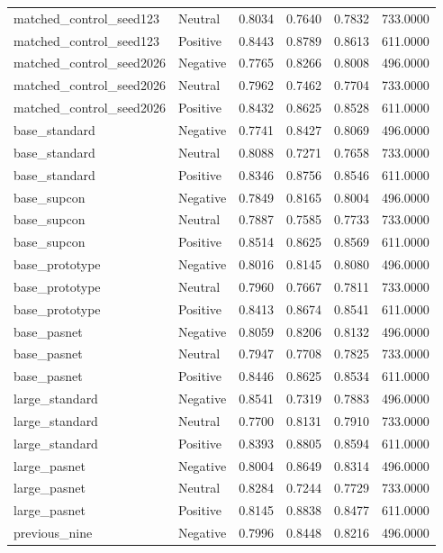 \begin{tabular}{llrrrr}
matched\_control\_seed123 & Neutral & 0.8034 & 0.7640 & 0.7832 & 733.0000 \\
matched\_control\_seed123 & Positive & 0.8443 & 0.8789 & 0.8613 & 611.0000 \\
matched\_control\_seed2026 & Negative & 0.7765 & 0.8266 & 0.8008 & 496.0000 \\
matched\_control\_seed2026 & Neutral & 0.7962 & 0.7462 & 0.7704 & 733.0000 \\
matched\_control\_seed2026 & Positive & 0.8432 & 0.8625 & 0.8528 & 611.0000 \\
base\_standard & Negative & 0.7741 & 0.8427 & 0.8069 & 496.0000 \\
base\_standard & Neutral & 0.8088 & 0.7271 & 0.7658 & 733.0000 \\
base\_standard & Positive & 0.8346 & 0.8756 & 0.8546 & 611.0000 \\
base\_supcon & Negative & 0.7849 & 0.8165 & 0.8004 & 496.0000 \\
base\_supcon & Neutral & 0.7887 & 0.7585 & 0.7733 & 733.0000 \\
base\_supcon & Positive & 0.8514 & 0.8625 & 0.8569 & 611.0000 \\
base\_prototype & Negative & 0.8016 & 0.8145 & 0.8080 & 496.0000 \\
base\_prototype & Neutral & 0.7960 & 0.7667 & 0.7811 & 733.0000 \\
base\_prototype & Positive & 0.8413 & 0.8674 & 0.8541 & 611.0000 \\
base\_pasnet & Negative & 0.8059 & 0.8206 & 0.8132 & 496.0000 \\
base\_pasnet & Neutral & 0.7947 & 0.7708 & 0.7825 & 733.0000 \\
base\_pasnet & Positive & 0.8446 & 0.8625 & 0.8534 & 611.0000 \\
large\_standard & Negative & 0.8541 & 0.7319 & 0.7883 & 496.0000 \\
large\_standard & Neutral & 0.7700 & 0.8131 & 0.7910 & 733.0000 \\
large\_standard & Positive & 0.8393 & 0.8805 & 0.8594 & 611.0000 \\
large\_pasnet & Negative & 0.8004 & 0.8649 & 0.8314 & 496.0000 \\
large\_pasnet & Neutral & 0.8284 & 0.7244 & 0.7729 & 733.0000 \\
large\_pasnet & Positive & 0.8145 & 0.8838 & 0.8477 & 611.0000 \\
previous\_nine & Negative & 0.7996 & 0.8448 & 0.8216 & 496.0000 \\

\end{tabular}
